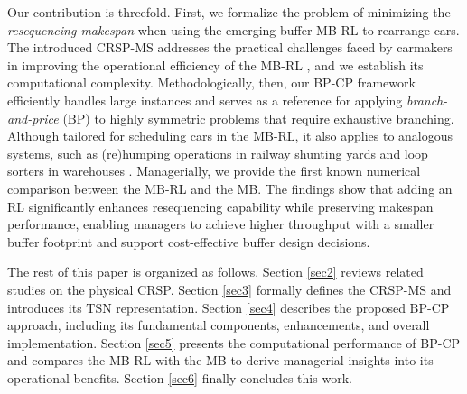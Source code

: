 \documentclass[12pt]{article}
\begin{document}
Our contribution is threefold. First, we formalize the problem of minimizing the \textit{resequencing makespan} when using the emerging buffer MB-RL to rearrange cars. The introduced CRSP-MS addresses the practical challenges faced by carmakers in improving the operational efficiency of the MB-RL \citep{moon2005simulation, yu2023analysis}, and we establish its computational complexity. Methodologically, then, our BP-CP framework efficiently handles large instances and serves as a reference for applying \textit{branch-and-price} (BP) to highly symmetric problems that require exhaustive branching. Although tailored for scheduling cars in the MB-RL, it also applies to analogous systems, such as (re)humping operations in railway shunting yards \citep{boysen2012shunting} and loop sorters in warehouses \citep{boysen2024order}. Managerially, we provide the first known numerical comparison between the MB-RL and the MB. The findings show that adding an RL significantly enhances resequencing capability while preserving makespan performance, enabling managers to achieve higher throughput with a smaller buffer footprint and support cost-effective buffer design decisions.



The rest of this paper is organized as follows. Section \ref{sec2} reviews related studies on the physical CRSP. Section \ref{sec3} formally defines the CRSP-MS and introduces its TSN representation. Section \ref{sec4} describes the proposed BP-CP approach, including its fundamental components, enhancements, and overall implementation. Section \ref{sec5} presents the computational performance of BP-CP and compares the MB-RL with the MB to derive managerial insights into its operational benefits. Section \ref{sec6} finally concludes this work.
\end{document}
